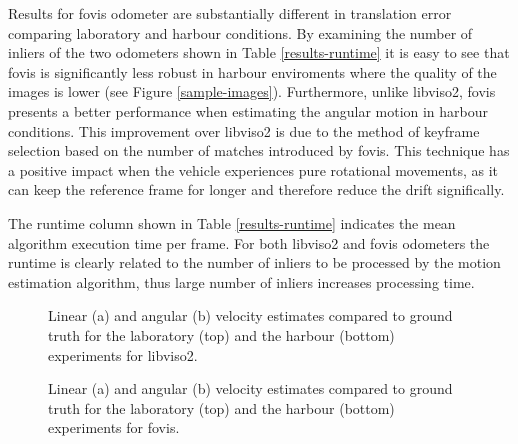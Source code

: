 \documentclass[conference]{IEEEtran}
\begin{document}
Results for fovis odometer are substantially different in translation error comparing laboratory and harbour conditions. By examining the number of inliers of the two odometers shown in Table \ref{results-runtime} it is easy to see that fovis is significantly less robust in harbour enviroments where the quality of the images is lower (see Figure \ref{sample-images}). Furthermore, unlike libviso2, fovis presents a better performance when estimating the angular motion in harbour conditions. This improvement over libviso2 is due to the method of keyframe selection based on the number of matches introduced by fovis. This technique has a positive impact when the vehicle experiences pure rotational movements, as it can keep the reference frame for longer and therefore reduce the drift significally.

The runtime column shown in Table \ref{results-runtime} indicates the mean algorithm execution time per frame. For both libviso2 and fovis odometers the runtime is clearly related to the number of inliers to be processed by the motion estimation algorithm, thus large number of inliers increases processing time.

\begin{figure}
  \begin{center}
  \end{center}
  \caption{Linear (a) and angular (b) velocity estimates compared to ground truth for the laboratory (top) and the harbour (bottom) experiments for libviso2.}
  \label{error-plots-viso2}
\end{figure}

\begin{figure}[!h]
  \begin{center}
  \end{center}
  \caption{Linear (a) and angular (b) velocity estimates compared to ground truth for the laboratory (top) and the harbour (bottom) experiments for fovis.}
  \label{error-plots-fovis}
\end{figure}
\end{document}

